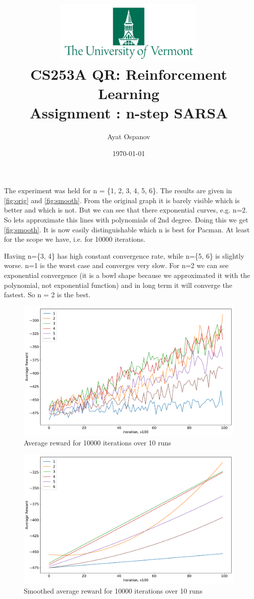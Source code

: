 \documentclass[12pt]{article}
\title{\Large\includegraphics[height=3cm]{pics/UVM.png} \\
    CS253A QR: Reinforcement Learning\\
    Assignment \textnumero 8: n-step SARSA}
\author{Ayat Ospanov}
\date{\today}
\begin{document}
    \maketitle

    The experiment was held for n = \{1, 2, 3, 4, 5, 6\}. The results are given
    in \autoref{fig:orig} and \autoref{fig:smooth}. From the original graph
    it is barely visible which is better and which is not. But we can see that
    there exponential curves, e.g. n=2. So lets approximate this lines with
    polynomials of 2nd degree. Doing this we get \autoref{fig:smooth}. It is
    now easily distinguishable which n is best for Pacman. At least for the scope
    we have, i.e. for 10000 iterations.

    Having n=\{3, 4\} has high constant convergence rate, while n=\{5, 6\} is
    slightly worse. n=1 is the worst case and converges very slow. For n=2 we
    can see exponential convergence (it is a bowl shape because we approximated
    it with the polynomial, not exponential function) and in long term it will
    converge the fastest. So n = 2 is the best.

    \begin{figure}[!t]
        \centering
        \includegraphics[width=\linewidth]{pics/graph}
        \caption{Average reward for 10000 iterations over 10 runs}
        \label{fig:orig}
    \end{figure}

    \begin{figure}[!t]
        \centering
        \includegraphics[width=\linewidth]{pics/graph_smooth}
        \caption{Smoothed average reward for 10000 iterations over 10 runs}
        \label{fig:smooth}
    \end{figure}
\end{document}
